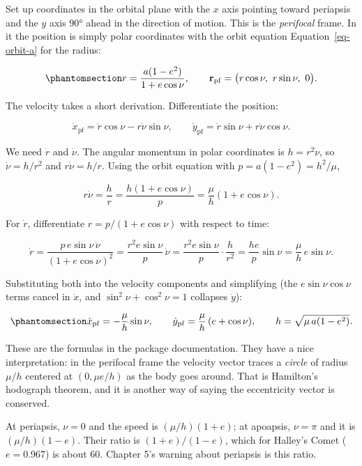 \documentclass[
  10.5pt,
  letterpaper,
]{scrbook}
\theoremstyle{definition}
\theoremstyle{plain}
\theoremstyle{remark}
\begin{document}
Set up coordinates in the orbital plane with the \(x\) axis pointing
toward periapsis and the \(y\) axis \(90°\) ahead in the direction of
motion. This is the \emph{perifocal} frame. In it the position is simply
polar coordinates with the orbit equation Equation~\ref{eq-orbit-a} for
the radius:

\begin{equation}\protect\phantomsection\label{eq-pf-position}{
r = \frac{a(1-e^2)}{1 + e\cos\nu}, \qquad
\mathbf{r}_{\mathrm{pf}} = \big(r\cos\nu,\ r\sin\nu,\ 0\big).
}\end{equation}

The velocity takes a short derivation. Differentiate the position:

\[
\dot x_{\mathrm{pf}} = \dot r\cos\nu - r\dot\nu\sin\nu, \qquad
\dot y_{\mathrm{pf}} = \dot r\sin\nu + r\dot\nu\cos\nu.
\]

We need \(\dot r\) and \(\dot\nu\). The angular momentum in polar
coordinates is \(h = r^2\dot\nu\), so \(\dot\nu = h/r^2\) and
\(r\dot\nu = h/r\). Using the orbit equation with
\(p = a(1-e^2) = h^2/\mu\),

\[
r\dot\nu = \frac{h}{r} = \frac{h(1+e\cos\nu)}{p} = \frac{\mu}{h}(1 + e\cos\nu).
\]

For \(\dot r\), differentiate \(r = p/(1+e\cos\nu)\) with respect to
time:

\[
\dot r = \frac{p\,e\sin\nu\,\dot\nu}{(1+e\cos\nu)^2} = \frac{r^2 e\sin\nu}{p}\,\dot\nu = \frac{r^2 e\sin\nu}{p}\cdot\frac{h}{r^2} = \frac{h e}{p}\sin\nu = \frac{\mu}{h}\,e\sin\nu.
\]

Substituting both into the velocity components and simplifying (the
\(e\sin\nu\cos\nu\) terms cancel in \(\dot x\), and
\(\sin^2\nu + \cos^2\nu = 1\) collapses \(\dot y\)):

\begin{equation}\protect\phantomsection\label{eq-pf-velocity}{
\dot x_{\mathrm{pf}} = -\frac{\mu}{h}\sin\nu, \qquad
\dot y_{\mathrm{pf}} = \frac{\mu}{h}\,(e + \cos\nu), \qquad
h = \sqrt{\mu\,a(1-e^2)}.
}\end{equation}

These are the formulas in the package documentation. They have a nice
interpretation: in the perifocal frame the velocity vector traces a
\emph{circle} of radius \(\mu/h\) centered at \((0, \mu e/h)\) as the
body goes around. That is Hamilton's hodograph theorem, and it is
another way of saying the eccentricity vector is conserved.

At periapsis, \(\nu = 0\) and the speed is \((\mu/h)(1+e)\); at
apoapsis, \(\nu = \pi\) and it is \((\mu/h)(1-e)\). Their ratio is
\((1+e)/(1-e)\), which for Halley's Comet (\(e = 0.967\)) is about 60.
Chapter 5's warning about periapsis is this ratio.
\end{document}
